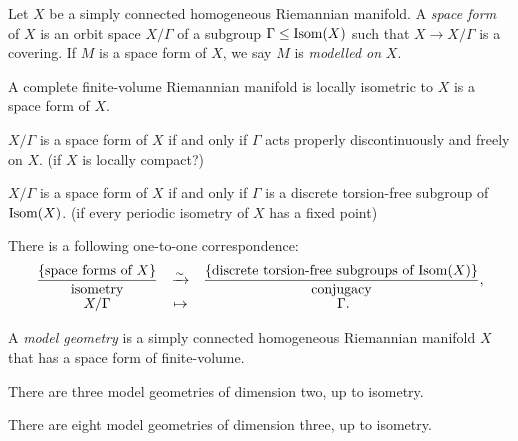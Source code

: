 \documentclass{../../large}
\begin{document}
\begin{prb}
Let $X$ be a simply connected homogeneous Riemannian manifold.
A \emph{space form} of $X$ is an orbit space $X/\Gamma$ of a subgroup $\Gamma\le\operatorname{Isom}(X)$ such that $X\to X/\Gamma$ is a covering.
If $M$ is a space form of $X$, we say $M$ is \emph{modelled on} $X$.
\begin{parts}
\item A complete finite-volume Riemannian manifold is locally isometric to $X$ is a space form of $X$.
\item $X/\Gamma$ is a space form of $X$ if and only if $\Gamma$ acts properly discontinuously and freely on $X$. (if $X$ is locally compact?)
\item $X/\Gamma$ is a space form of $X$ if and only if $\Gamma$ is a discrete torsion-free subgroup of $\operatorname{Isom}(X)$. (if every periodic isometry of $X$ has a fixed point)
\item There is a following one-to-one correspondence:
\[\begin{array}{ccc}
\dfrac{\{\text{space forms of $X$}\}}{\text{isometry}}
&\xrightarrow{\sim}&
\dfrac{\{\text{discrete torsion-free subgroups of $\operatorname{Isom}(X)$}\}}{\text{conjugacy}},\\
X/\Gamma&\mapsto&\Gamma.
\end{array}\]
\end{parts}
\end{prb}
\begin{pf}

\end{pf}


\begin{prb}
A \emph{model geometry} is a simply connected homogeneous Riemannian manifold $X$ that has a space form of finite-volume.
\begin{parts}
\item There are three model geometries of dimension two, up to isometry.
\item There are eight model geometries of dimension three, up to isometry.
\end{parts}
\end{prb}
\begin{pf}

\end{pf}
\end{document}
